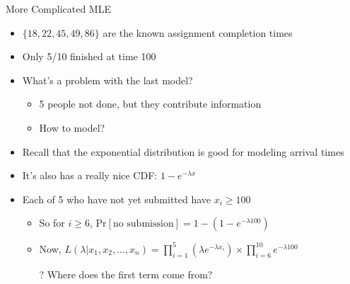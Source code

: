 \documentclass[aspectratio=169]{beamer}
\begin{document}
\begin{frame}{More Complicated MLE}

\begin{itemize}
\item $\{18, 22, 45, 49, 86\}$ are the known assignment completion times
\item Only 5/10 finished at time 100
\item What's a problem with the last model?
	\begin{itemize}
	\item 5 people not done, but they contribute information
	\item How to model?
	\end{itemize}
\item Recall that the exponential distribution is good for modeling arrival times
\item It's also has a really nice CDF: $1- e^{-\lambda x}$
\item Each of 5 who have not yet submitted have $x_i \geq 100$
	\begin{itemize}
	\item So for $i \geq 6$, Pr$[\textrm{no submission}] = 1 - (1 - e^{-\lambda 100})$
	\item Now, $L (\lambda | x_1, x_2, ..., x_n) = \prod_{i = 1}^5 ( \lambda e^{-\lambda x_i}) \times
			\prod_{i = 6}^{10} e^{-\lambda 100}$
	\item[?] Where does the first term come from? %
	\end{itemize}
\end{itemize}
\end{frame}
\end{document}
